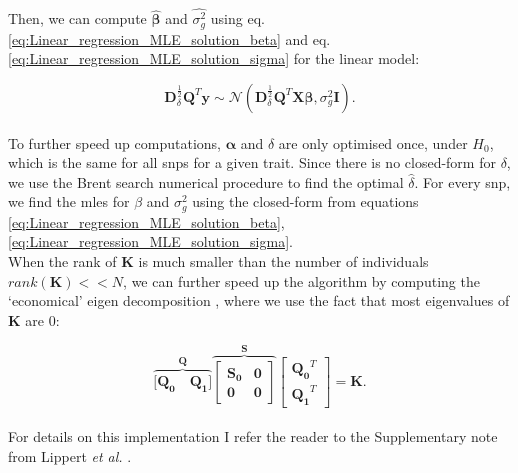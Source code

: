 Then, we can compute $\hat{\boldsymbol{\beta}}$ and $\hat{\sigma_g^2}$ using eq. \eqref{eq:Linear_regression_MLE_solution_beta} and eq. \eqref{eq:Linear_regression_MLE_solution_sigma} for the linear model:

\begin{equation}
    \mathbf{D}^{\frac{1}{2}}_{\delta}\mathbf{Q}^{T}\mathbf{y} \sim \mathcal{N}(\mathbf{D}^{\frac{1}{2}}_{\delta}\mathbf{Q}^{T}\mathbf{X}\boldsymbol{\beta}, \sigma_g^2\mathbf{I}).
\end{equation} \\

To further speed up computations, $\boldsymbol{\alpha}$ and $\delta$ are only optimised once, under $H_0$, which is the same for all \gls{snp}s for a given trait.
Since there is no closed-form for $\delta$, we use the Brent search numerical procedure \cite{goddard2009estimating} to find the optimal $\hat{\delta}$.
For every \gls{snp}, we find the \gls{mle}s for $\beta$ and $\sigma^2_g$ using the closed-form from equations \eqref{eq:Linear_regression_MLE_solution_beta},\eqref{eq:Linear_regression_MLE_solution_sigma}.\\

When the rank of $\mathbf{K}$ is much smaller than the number of individuals $rank(\mathbf{K}) << N$,  we can further speed up the algorithm by computing the `economical' eigen decomposition \cite{lippert2011fast}, where we use the fact that most eigenvalues of $\mathbf{K}$ are 0:

\begin{equation}\label{eq:economic_eigen_decomposition}
    \overbrace{[\mathbf{Q_0} \quad \mathbf{Q_1]}}^{\mathbf{Q}}
            \overbrace{\left[\begin{array}{cc}
                \mathbf{S_0} & \mathbf{0}\\
                        \mathbf{0} & \mathbf{0}
            \end{array}\right]}^{\mathbf{S}}
        \left[\begin{array}{c}
            \mathbf{Q_0}^T \\
            \mathbf{Q_1}^T
        \end{array}\right] = \mathbf{K}.
\end{equation}\\

For details on this implementation I refer the reader to the Supplementary note from Lippert \textit{et al.} \cite{lippert2011fast}. \\

